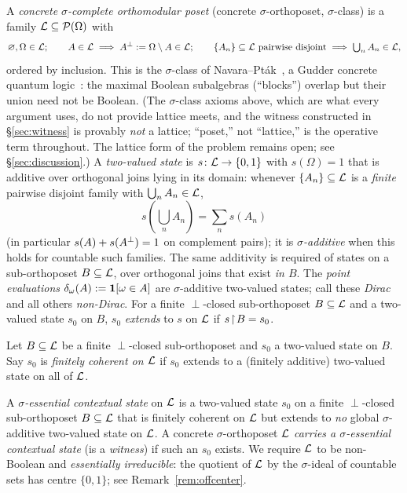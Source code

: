 A \emph{concrete $\sigma$-complete orthomodular poset} (concrete $\sigma$-orthoposet,
$\sigma$-class)
is a family $\mathcal{L} \subseteq \mathcal{P}(\Omega)$ with
\[
  \varnothing, \Omega \in \mathcal{L}; \qquad
  A \in \mathcal{L} \implies A{}^{\perp} := \Omega\setminus A \in \mathcal{L}; \qquad
  \{A_n\}\subseteq\mathcal{L} \text{ pairwise disjoint} \implies \textstyle\bigcup_n A_n \in \mathcal{L},
\]
ordered by inclusion. This is the $\sigma$-class of Navara--Pt\'ak~\cite{NavaraPtak1983},
a Gudder concrete quantum logic~\cite{Gudder1969,PtakPulmannova1991}: the maximal
Boolean subalgebras (``blocks'') overlap but their union need not be Boolean.
(The $\sigma$-class axioms above, which are what every argument uses, do not provide
lattice meets, and the witness constructed in \S\ref{sec:witness} is provably
\emph{not} a lattice; ``poset,'' not ``lattice,'' is the operative term throughout.
The lattice form of the problem remains open;
see \S\ref{sec:discussion}.) A
\emph{two-valued state} is $s\colon\mathcal{L}\to\{0,1\}$ with $s(\Omega)=1$ that is
additive over orthogonal joins lying in its domain: whenever $\{A_n\}\subseteq\mathcal{L}$
is a \emph{finite} pairwise disjoint family with $\bigcup_n A_n\in\mathcal{L}$,
\[
  s\!\left(\textstyle\bigcup_n A_n\right)=\textstyle\sum_n s(A_n)
\]
(in particular $s(A)+s(A{}^{\perp})=1$ on complement pairs); it is \emph{$\sigma$-additive}
when this holds for countable such families. The same additivity is required of states
on a sub-orthoposet $B\subseteq\mathcal{L}$, over orthogonal joins that exist \emph{in $B$}.
The \emph{point evaluations} $\delta_\omega(A):=\mathbf{1}[\omega\in A]$ are
$\sigma$-additive two-valued states; call these \emph{Dirac} and all others
\emph{non-Dirac}. For a finite $\perp$-closed sub-orthoposet $B\subseteq\mathcal{L}$ and a
two-valued state $s_0$ on $B$, $s_0$ \emph{extends} to $s$ on $\mathcal{L}$ if $s\!\restriction\! B=s_0$.

\begin{definition}\label{def:coherence}
Let $B\subseteq\mathcal{L}$ be a finite $\perp$-closed sub-orthoposet and $s_0$ a two-valued
state on $B$. Say $s_0$ is \emph{finitely coherent on $\mathcal{L}$} if $s_0$ extends to a
(finitely additive) two-valued state on all of $\mathcal{L}$.
\end{definition}

\begin{definition}\label{def:sigma-essential}
A \emph{$\sigma$-essential contextual state} on $\mathcal{L}$ is a two-valued state $s_0$
on a finite $\perp$-closed sub-orthoposet $B \subseteq \mathcal{L}$ that is finitely
coherent on $\mathcal{L}$ but extends to \emph{no} global $\sigma$-additive two-valued
state on $\mathcal{L}$. A concrete $\sigma$-orthoposet $\mathcal{L}$ \emph{carries a
$\sigma$-essential contextual state} (is a \emph{witness}) if such an $s_0$
exists. We require $\mathcal{L}$ to be non-Boolean and \emph{essentially irreducible}:
the quotient of $\mathcal{L}$ by the $\sigma$-ideal of countable sets has centre
$\{0,1\}$; see Remark~\ref{rem:offcenter}.
\end{definition}

